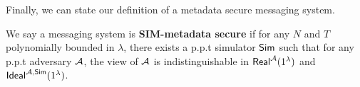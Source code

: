 Finally, we can state our definition of a metadata secure messaging system.

\begin{definition}
\label{defn:messaging-security}
We say a messaging system is \textbf{SIM-metadata secure} if for any $N$ and $T$ polynomially bounded in $\lambda$, there exists a p.p.t simulator $\mathsf{Sim}$ such that for any p.p.t adversary $\mathcal{A}$, the view of $\mathcal{A}$ is indistinguishable in $\mathsf{Real}^{\mathcal{A}}(1^{\lambda})$ and $\mathsf{Ideal}^{\mathcal{A}, \mathsf{\mathsf{Sim}}}(1^{\lambda})$.
\end{definition}


